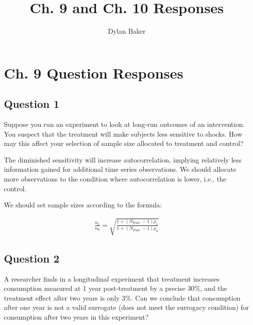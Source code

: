 \documentclass[10pt]{article}
\title{Ch. 9 and Ch. 10 Responses}
\author{Dylan Baker}
\begin{document}
\maketitle

\tableofcontents

\section{Ch. 9 Question Responses}

\subsection{Question 1}

Suppose you run an experiment to look at long-run outcomes of an intervention. You suspect that the treatment will make subjects less sensitive to shocks. How may this affect your selection of sample size allocated to treatment and control?

\hrulefill\hspace{0.5em}\dotfill\hspace{0.5em}\hrulefill

The diminished sensitivity will increase autocorrelation,
implying relatively less information gained for additional 
time series observations. 
We should allocate more observations to 
the condition where autocorrelation is lower,
i.e., the control.

We should set sample sizes according to the formula:

\begin{align}
    \frac{n_1}{n_0}=\sqrt{\frac{1+\left(N_{\text {Post }}-1\right) \rho_1}{1+\left(N_{\text {Post }}-1\right) \rho_0}}
\end{align}


\subsection{Question 2}
A researcher finds in a longitudinal experiment that treatment increases consumption measured at 1 year post-treatment by a precise $30 \%$, and the treatment effect after two years is only $3 \%$. Can we conclude that consumption after one year is not a valid surrogate (does not meet the surrogacy condition) for consumption after two years in this experiment?

\hrulefill\hspace{0.5em}\dotfill\hspace{0.5em}\hrulefill
\end{document}
